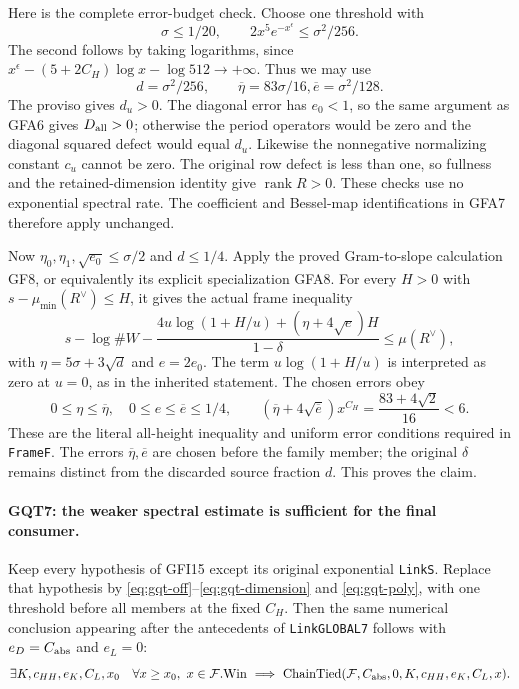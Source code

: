 \documentclass[11pt,a4paper]{article}
\numberwithin{equation}{section}
\theoremstyle{remark}\newtheorem{remark}[theorem]{Remark}
\begin{document}
Here is the complete error-budget check. Choose one threshold with
\[
 \sigma\le1/20,\qquad 2x^5e^{-x^\epsilon}
                                      \le\sigma^2/256.
\]
The second follows by taking logarithms, since
$x^\epsilon-(5+2C_H)\log x-\log512\to+\infty$.
Thus we may use
\[
      d=\sigma^2/256,\qquad
      \overline\eta=83\sigma/16,
      \overline e=\sigma^2/128.                         \label{eq:gqt-frame-errors}
\]
The proviso gives $d_u>0$. The diagonal error has $e_0<1$,
so the same argument as GFA6 gives $D_{\rm all}>0$; otherwise
the period operators would be zero and the diagonal squared
defect would equal $d_u$. Likewise the nonnegative normalizing
constant $c_u$ cannot be zero. The original row defect is less
than one, so fullness and the retained-dimension identity give
$\operatorname{rank}R>0$. These checks use no exponential
spectral rate. The coefficient and Bessel-map identifications
in GFA7 therefore apply unchanged.

Now $\eta_0,\eta_1,\sqrt{e_0}\le\sigma/2$ and
$d\le1/4$. Apply the proved Gram-to-slope calculation GF8,
or equivalently its explicit specialization GFA8. For every
$H>0$ with $s-\mu_{\min}(R^\vee)\le H$, it gives the actual
frame inequality
\[
 s-\log\#W-
 \frac{4u\log(1+H/u)+(\eta+4\sqrt e)H}{1-\delta}
                         \le\mu(R^\vee),
\]
with $\eta=5\sigma+3\sqrt d$ and $e=2e_0$.
The term $u\log(1+H/u)$ is interpreted as zero at $u=0$,
as in the inherited statement. The chosen errors obey
\[
 0\le\eta\le\overline\eta,\quad
 0\le e\le\overline e\le1/4,
 \qquad
 (\overline\eta+4\sqrt{\overline e})x^{C_H}
       =\frac{83+4\sqrt2}{16}<6.
\]
These are the literal all-height inequality and uniform error
conditions required in \texttt{Frame\allowbreak F}. The errors
$\overline\eta,\overline e$ are chosen before the family member;
the original $\delta$ remains distinct from the discarded source
fraction $d$. This proves the claim.

\paragraph{GQT7: the weaker spectral estimate is sufficient for the final consumer.}
\label{claim:GQT7}
Keep every hypothesis of GFI15 except its original exponential
\texttt{Link\allowbreak S}. Replace that hypothesis by
\eqref{eq:gqt-off}--\eqref{eq:gqt-dimension} and
\eqref{eq:gqt-poly}, with one threshold before all members at
the fixed $C_H$. Then the same numerical conclusion appearing after
the antecedents of \texttt{Link\allowbreak GLOBAL7} follows with
$e_D=C_{\rm abs}$ and $e_L=0$:
\[
 \exists K,\allowbreak{} c_{HH},\allowbreak{} e_K,\allowbreak{} C_L,\allowbreak{} x_0\quad
 \forall x\ge x_0,\ x\in\mathcal F.\mathrm{Win}\ \Longrightarrow\
 \mathrm{ChainTied}(\mathcal F,\allowbreak{} C_{\rm abs},0,\allowbreak{} K,\allowbreak{} c_{HH},\allowbreak{} e_K,\allowbreak{} C_L,\allowbreak{} x).
\]
\end{document}
